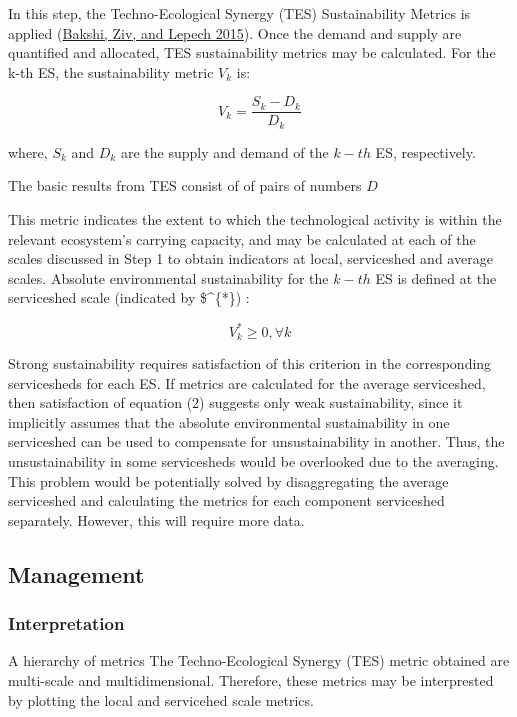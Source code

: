 \documentclass[
  14pt,
]{extarticle}
\begin{document}
In this step, the Techno-Ecological Synergy (TES) Sustainability Metrics is applied (\protect\hyperlink{ref-Bakshi2015}{Bakshi, Ziv, and Lepech 2015}).
Once the demand and supply are quantified and allocated, TES sustainability metrics may be calculated.
For the k-th ES, the sustainability metric \(V_{k}\) is:

\[
V_{k} = \frac{S_{k} - D_{k}}{D_{k}}
\]

where, \(S_{k}\) and \(D_{k}\) are the supply and demand of the \(k-th\) ES, respectively.

The basic results from TES consist of of pairs of numbers \({D}\)

This metric indicates the extent to which the technological activity is within the relevant ecosystem's carrying capacity, and may be calculated at each of the scales discussed in Step 1 to obtain indicators at local, serviceshed and average scales.
Absolute environmental sustainability for the \(k-th\) ES is defined at the serviceshed scale (indicated by \$\^{}\{*\}) :

\[
V_{k}^{*} \geq 0, \forall k
\]

Strong sustainability requires satisfaction of this criterion in the corresponding servicesheds for each ES.
If metrics are calculated for the average serviceshed, then satisfaction of equation (2) suggests only weak sustainability, since it implicitly assumes that the absolute environmental sustainability in one serviceshed can be used to compensate for unsustainability in another.
Thus, the unsustainability in some servicesheds would be overlooked due to the averaging.
This problem would be potentially solved by disaggregating the average serviceshed and calculating the metrics for each component serviceshed separately.
However, this will require more data.

\hypertarget{management}{%
\subsection{Management}\label{management}}

\hypertarget{interpretation}{%
\subsubsection{Interpretation}\label{interpretation}}

A hierarchy of metrics
The Techno-Ecological Synergy (TES) metric obtained are multi-scale and multidimensional.
Therefore, these metrics may be interprested by plotting the local and servicehed scale metrics.
\end{document}
